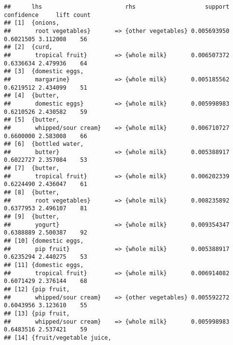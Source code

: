 \documentclass[]{article}
\begin{document}
\begin{verbatim}
##      lhs                        rhs                    support confidence     lift count
## [1]  {onions,                                                                           
##       root vegetables}       => {other vegetables} 0.005693950  0.6021505 3.112008    56
## [2]  {curd,                                                                             
##       tropical fruit}        => {whole milk}       0.006507372  0.6336634 2.479936    64
## [3]  {domestic eggs,                                                                    
##       margarine}             => {whole milk}       0.005185562  0.6219512 2.434099    51
## [4]  {butter,                                                                           
##       domestic eggs}         => {whole milk}       0.005998983  0.6210526 2.430582    59
## [5]  {butter,                                                                           
##       whipped/sour cream}    => {whole milk}       0.006710727  0.6600000 2.583008    66
## [6]  {bottled water,                                                                    
##       butter}                => {whole milk}       0.005388917  0.6022727 2.357084    53
## [7]  {butter,                                                                           
##       tropical fruit}        => {whole milk}       0.006202339  0.6224490 2.436047    61
## [8]  {butter,                                                                           
##       root vegetables}       => {whole milk}       0.008235892  0.6377953 2.496107    81
## [9]  {butter,                                                                           
##       yogurt}                => {whole milk}       0.009354347  0.6388889 2.500387    92
## [10] {domestic eggs,                                                                    
##       pip fruit}             => {whole milk}       0.005388917  0.6235294 2.440275    53
## [11] {domestic eggs,                                                                    
##       tropical fruit}        => {whole milk}       0.006914082  0.6071429 2.376144    68
## [12] {pip fruit,                                                                        
##       whipped/sour cream}    => {other vegetables} 0.005592272  0.6043956 3.123610    55
## [13] {pip fruit,                                                                        
##       whipped/sour cream}    => {whole milk}       0.005998983  0.6483516 2.537421    59
## [14] {fruit/vegetable juice,                                                            

\end{verbatim}
\end{document}
